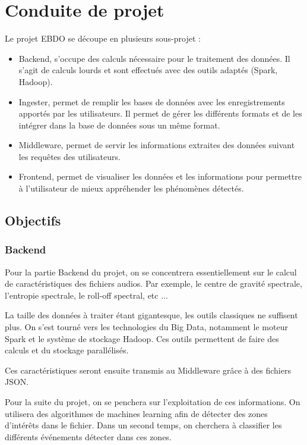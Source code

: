 \documentclass{article}
\begin{document}
\section{Conduite de projet}

Le projet EBDO se découpe en plusieurs sous-projet :
\begin{itemize}

	\item Backend, s'occupe des calculs nécessaire pour le traitement des données. Il s'agit de calculs lourds et sont effectués avec des outils adaptés (Spark, Hadoop).

	\item Ingester, permet de remplir les bases de données avec les enregistrements apportés par les utilisateurs. Il permet de gérer les différents formats et de les intégrer dans la base de données sous un même format.

	\item Middleware, permet de servir les informations extraites des données suivant les requêtes des utilisateurs.

	\item Frontend, permet de visualiser les données et les informations pour permettre à l'utilisateur de mieux appréhender les phénomènes détectés.

\end{itemize}

\subsection{Objectifs}

\subsubsection{Backend}

Pour la partie Backend du projet, on se concentrera essentiellement sur le calcul de caractéristiques des fichiers audios. Par exemple, le centre de gravité spectrale, l'entropie spectrale, le roll-off spectral, etc ...

La taille des données à traiter étant gigantesque, les outils classiques ne suffisent plus. On s'est tourné vers les technologies du Big Data, notamment le moteur Spark et le système de stockage Hadoop. Ces outils permettent de faire des calculs et du stockage parallélisés.

Ces caractéristiques seront ensuite transmis au Middleware grâce à des fichiers JSON.

Pour la suite du projet, on se penchera sur l'exploitation de ces informations. On utilisera des algorithmes de machines learning afin de détecter des zones d'intérêts dans le fichier. Dans un second temps, on cherchera à classifier les différents événements détecter dans ces zones.
\end{document}
